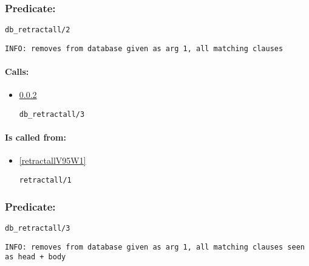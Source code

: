 \subsubsection{Predicate:} \label{dbV95WretractallV95W2}

\begin{verbatim}
db_retractall/2
\end{verbatim}

{\small \begin{verbatim}
INFO: removes from database given as arg 1, all matching clauses

\end{verbatim}}
\paragraph{Calls:} 
\begin{itemize}
\item \ref{dbV95WretractallV95W3} 
\begin{verbatim}
db_retractall/3
\end{verbatim}

\end{itemize}
\paragraph{Is called from:} 
\begin{itemize}
\item \ref{retractallV95W1} 
\begin{verbatim}
retractall/1
\end{verbatim}

\end{itemize}

\subsubsection{Predicate:} \label{dbV95WretractallV95W3}

\begin{verbatim}
db_retractall/3
\end{verbatim}

{\small \begin{verbatim}
INFO: removes from database given as arg 1, all matching clauses seen as head + body

\end{verbatim}}
